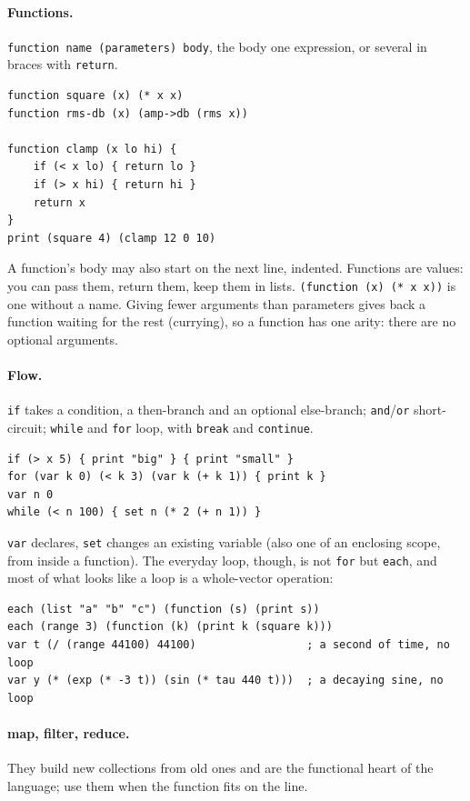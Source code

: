 \documentclass[11pt,a4paper]{article}
\newcommand{\musil}[1]{\lstinline[style=musilinline]{#1}}
\begin{document}
\paragraph{Functions.} \musil{function name (parameters) body}, the body one expression, or
several in braces with \musil{return}.

\begin{lstlisting}
function square (x) (* x x)
function rms-db (x) (amp->db (rms x))

function clamp (x lo hi) {
    if (< x lo) { return lo }
    if (> x hi) { return hi }
    return x
}
print (square 4) (clamp 12 0 10)
\end{lstlisting}

A function's body may also start on the next line, indented. Functions are values: you can
pass them, return them, keep them in lists. \musil{(function (x) (* x x))} is one without a
name. Giving fewer arguments than parameters gives back a function waiting for the rest
(currying), so a function has one arity: there are no optional arguments.

\paragraph{Flow.} \musil{if} takes a condition, a then-branch and an optional else-branch;
\musil{and}/\musil{or} short-circuit; \musil{while} and \musil{for} loop, with
\musil{break} and \musil{continue}.

\begin{lstlisting}
if (> x 5) { print "big" } { print "small" }
for (var k 0) (< k 3) (var k (+ k 1)) { print k }
var n 0
while (< n 100) { set n (* 2 (+ n 1)) }
\end{lstlisting}

\musil{var} declares, \musil{set} changes an existing variable (also one of an enclosing
scope, from inside a function). The everyday loop, though, is not \musil{for} but
\musil{each}, and most of what looks like a loop is a whole-vector operation:

\begin{lstlisting}
each (list "a" "b" "c") (function (s) (print s))
each (range 3) (function (k) (print k (square k)))
var t (/ (range 44100) 44100)                 ; a second of time, no loop
var y (* (exp (* -3 t)) (sin (* tau 440 t)))  ; a decaying sine, no loop
\end{lstlisting}

\paragraph{map, filter, reduce.} They build new collections from old ones and are the
functional heart of the language; use them when the function fits on the line.
\end{document}
